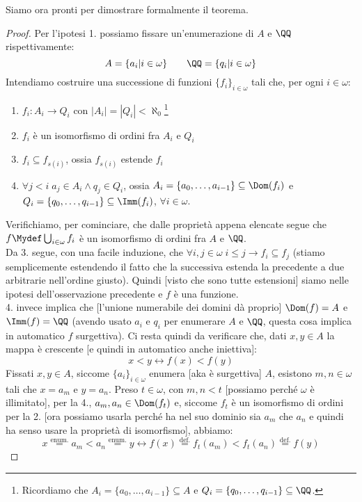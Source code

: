 \documentclass[11pt]{scrartcl}
\begin{document}
Siamo ora pronti per dimostrare formalmente il teorema.

\begin{proof}
	Per l'ipotesi 1. possiamo fissare un'enumerazione di $A$ e $\QQ$ rispettivamente:
	\[ A = \{a_i | i \in \omega\} \qquad \QQ = \{q_i | i \in \omega\}
		\]
	Intendiamo costruire una successione di funzioni $\{f_i\}_{i \in \omega}$ tali che, per ogni $i \in \omega$:
	\begin{enumerate}[1.]
		\item $f_i : A_i \rightarrow Q_i$ con $|A_i| = |Q_i| < \aleph_0$\footnote{Ricordiamo che $A_i = \{a_0,\ldots,a_{i-1}\} \subseteq A$ e $Q_i = \{q_0,\ldots,q_{i-1}\} \subseteq \QQ$.}
		\item $f_i$ è un isomorfismo di ordini fra $A_i$ e $Q_i$
		\item $f_{i} \subseteq f_{s(i)}$, ossia $f_{s(i)}$ estende $f_i$
		\item $\forall j < i \; a_j \in A_i \land q_j \in Q_i$, ossia $A_i = \{a_0,\ldots,a_{i-1}\} \subseteq \Dom(f_i)$ e $Q_i = \{q_0,\ldots,q_{i-1}\} \subseteq \Imm(f_i)$, $\forall i \in \omega$.
	\end{enumerate}
	Verifichiamo, per cominciare, che dalle proprietà appena elencate segue che $f\Mydef \bigcup_{i \in \omega} f_i$ è un isomorfismo di ordini fra $A$ e $\QQ$.\\
	Da 3. segue, con una facile induzione, che $\forall i,j \in \omega \; i \leq j \rightarrow f_i \subseteq f_j$ (stiamo semplicemente estendendo il fatto che la successiva estenda la precedente a 
	due arbitrarie nell'ordine giusto). Quindi [visto che sono tutte estensioni] siamo nelle ipotesi dell'osservazione precedente e $f$ è una funzione.\\
	4. invece implica che [l'unione numerabile dei domini dà proprio] $\Dom(f) = A$ e $\Imm(f)  = \QQ$ (avendo usato $a_i$ e $q_i$ per enumerare $A$ e $\QQ$, questa cosa implica in automatico $f$ surgettiva). Ci resta quindi da verificare che, dati $x,y \in A$ la mappa è crescente [e quindi in automatico anche iniettiva]:
	\[ x < y \leftrightarrow f(x) < f(y)
		\]
	Fissati $x,y \in A$, siccome $\{a_i\}_{i \in \omega}$ enumera [aka è surgettiva] $A$, esistono $m,n \in \omega$ tali che $x = a_m$ e $y = a_n$. Preso $t \in \omega$, con $m,n < t$ [possiamo perché $\omega$ è illimitato], per la 4., $a_m,a_n \in \Dom(f_t)$ e, siccome $f_t$ è 
	un isomorfismo di ordini per la 2. [ora possiamo usarla perché ha nel suo dominio sia $a_m$ che $a_n$ e quindi ha senso usare la proprietà di isomorfismo], abbiamo:
	\[ x \overset{\text{enum.}}{=} a_m < a_n \overset{\text{enum.}}{=} y \leftrightarrow f(x) \overset{\text{def.}}{=} f_t(a_m) < f_t(a_n) \overset{\text{def.}}{=} f(y)
\]
\end{proof}
\end{document}
